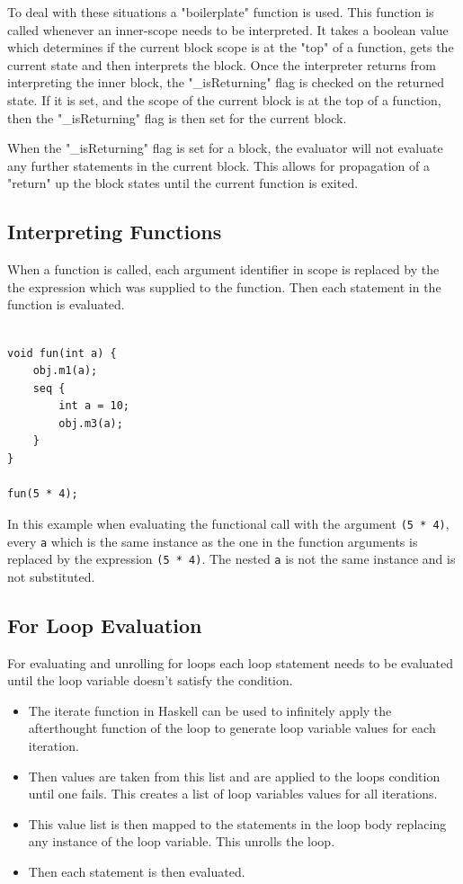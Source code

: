 To deal with these situations a "boilerplate" function is used. This function
is called whenever an inner-scope needs to be interpreted. It
takes a boolean value which determines if the current block scope is at
the "top" of a function, gets the current state and then interprets the block.
Once the interpreter returns from interpreting the inner block, the "\_isReturning"
flag is checked on the returned state. If it is set, and the scope
of the current block is at the top of a function, then the "\_isReturning" flag
is then set for the current block.
 
When the "\_isReturning" flag is set for a block, the evaluator will not evaluate
any further statements in the current block. This allows for propagation of a "return"
up the block states until the current function is exited.


\subsection{Interpreting Functions}
When a function is called, each argument identifier in scope
is replaced by the the expression which was supplied to the function.
Then each statement in the function is evaluated.

\begin{lstlisting}[style=myGPC]

void fun(int a) {
    obj.m1(a);
    seq {
        int a = 10;
        obj.m3(a);
    }    
}

fun(5 * 4);

\end{lstlisting}

In this example when evaluating the functional call with the argument \texttt{(5 * 4)},
every \texttt{a} which is the same instance as the one in the function arguments
is replaced by the expression \texttt{(5 * 4)}. The nested \texttt{a} is not the same
instance and is not substituted.


\subsection{For Loop Evaluation}

For evaluating and unrolling for loops each loop statement needs to be evaluated
until the loop variable doesn't satisfy the condition. 

\begin{itemize}
\item The iterate function in Haskell can be used to infinitely apply the afterthought function
of the loop to generate loop variable values for each iteration.

\item Then values are taken from this list and are applied to the loops condition until
one fails. This creates a list of loop variables values for all iterations. 

\item This value list is then mapped to the statements in the loop body replacing any instance
of the loop variable. This unrolls the loop.

\item Then each statement is then evaluated. 
\end{itemize}


